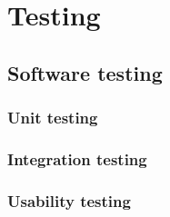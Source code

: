 \section{Testing}

\subsection{Software testing}

	\subsubsection{Unit testing}


	\subsubsection{Integration testing} %


	\subsubsection{Usability testing}

